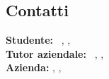 
\subsection{Contatti}
	\textbf{Studente:} \nomeStudente\ \cognomeStudente, \href{mailto:\emailStudente}{\emailStudente}, \telStudente \\
	\newline
	\textbf{Tutor aziendale:} \nomeTutorAziendale\ \cognomeTutorAziendale, \href{mailto:\emailTutorAziendale}{\emailTutorAziendale}, \telTutorAziendale \\
	\newline
	\textbf{Azienda:} \ragioneSocAzienda, \indirizzoAzienda, \href{\sitoAzienda}{\sitoAzienda}

